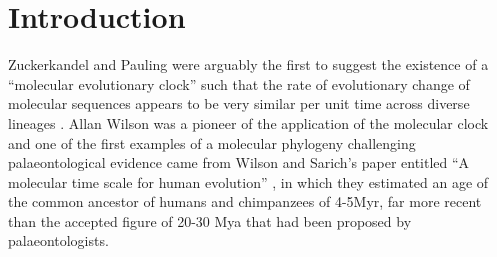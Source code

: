 \section{Introduction} 
Zuckerkandel and Pauling were arguably the first to suggest the existence of a ``molecular evolutionary clock'' such that the rate of evolutionary change of molecular sequences appears to be very similar per unit time across diverse lineages \cite{zuckerkandl1965}. Allan Wilson was a pioneer of the application of the molecular clock and one of the first examples of a molecular phylogeny challenging palaeontological evidence came from Wilson and Sarich's paper entitled ``A molecular time scale for human evolution'' \cite{WilsonSarich1969}, in which they estimated an age of the common ancestor of humans and chimpanzees of 4-5Myr, far more recent than the accepted figure of 20-30 Mya that had been proposed by palaeontologists.
  
  
  
  
  
  
  
  